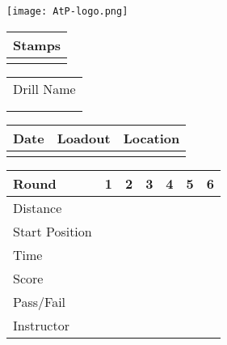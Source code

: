 \documentclass[../Cover.tex]{subfiles}
\begin{document}
\begin{minipage}[t]{0.15\textwidth} 
	\texttt{[image: AtP-logo.png]}
	\begin{tabular}{p{}|}
		Stamps \\
		\hline
		\\[5.5cm]
	\end{tabular}
\end{minipage}
\hfill
\begin{minipage}[t]{0.85\textwidth}

	\begin{minipage}[t]{3cm}
		\begin{tabular}{ p{3cm} }			
			\large Drill Name\\[0.5cm]
			\\
			\hline
			\\	
		\end{tabular}
	\end{minipage}
	\hfill
	\begin{minipage}[t]{0.3\textwidth}
		\begin{tabular}{ | p{1.5cm} | p{1.5cm} | p{1.5cm} |}
			\hline
			Date & Loadout & Location\\ 
			\hline
			&  &  \\ 
			\hline
		\end{tabular}
	\end{minipage}
	\begin{tabular}{ | p{1.5cm} | p{1cm} | p{.5cm} | p{.5cm} | p{.5cm} | p{.5cm} | p{.5cm} |}
		\hline
		Round & 1 & 2 & 3 & 4 & 5 & 6 \\ 
		\hline
		\tiny Distance & & & & & & \\ 		
		\hline
		\tiny Start Position & & & & & & \\
		\hline
		\tiny Time & & & & & & \\
		\hline
		\tiny Score & & & & & & \\
		\hline
		\tiny Pass/Fail & & & & & & \\
		\hline
		\tiny Instructor & & & & & & \\
		\hline
	\end{tabular}
\end{minipage}
\end{document}
